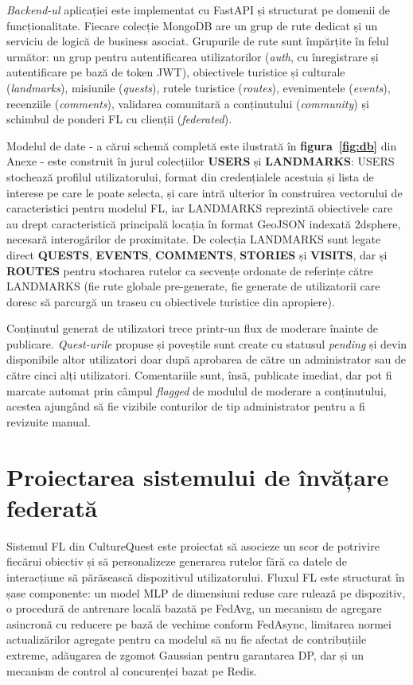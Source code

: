 \documentclass[12pt,a4paper]{report}
\begin{document}
\textit{Backend-ul} aplicației este implementat cu FastAPI și structurat pe domenii de funcționalitate. Fiecare colecție MongoDB are un grup de rute dedicat și un serviciu de logică de business asociat. Grupurile de rute sunt împărțite în felul următor: un grup pentru autentificarea utilizatorilor (\textit{auth}, cu înregistrare și autentificare pe bază de token JWT), obiectivele turistice și culturale (\textit{landmarks}), misiunile (\textit{quests}), rutele turistice (\textit{routes}), evenimentele (\textit{events}), recenziile (\textit{comments}), validarea comunitară a conținutului (\textit{community}) și schimbul de ponderi FL cu clienții (\textit{federated}).

Modelul de date - a cărui schemă completă este ilustrată în \textbf{figura~\ref{fig:db}} din Anexe - este construit în jurul colecțiilor \textbf{USERS} și \textbf{LANDMARKS}: USERS stochează profilul utilizatorului, format din credențialele acestuia și lista de interese pe care le poate selecta, și care intră ulterior în construirea vectorului de caracteristici pentru modelul FL, iar LANDMARKS reprezintă obiectivele care au drept caracteristică principală locația în format GeoJSON indexată 2dsphere, necesară interogărilor de proximitate. De colecția LANDMARKS sunt legate direct \textbf{QUESTS}, \textbf{EVENTS}, \textbf{COMMENTS}, \textbf{STORIES} și \textbf{VISITS}, dar și \textbf{ROUTES} pentru stocharea rutelor ca secvențe ordonate de referințe către LANDMARKS (fie rute globale pre-generate, fie generate de utilizatorii care doresc să parcurgă un traseu cu obiectivele turistice din apropiere).

Conținutul generat de utilizatori trece printr-un flux de moderare înainte de publicare. \textit{Quest-urile} propuse și poveștile sunt create cu statusul \textit{pending} și devin disponibile altor utilizatori doar după aprobarea de către un administrator sau de către cinci alți utilizatori. Comentariile sunt, însă, publicate imediat, dar pot fi marcate automat prin câmpul \textit{flagged} de modulul de moderare a conținutului, acestea ajungând să fie vizibile conturilor de tip administrator pentru a fi revizuite manual.

\section{Proiectarea sistemului de învățare federată}

Sistemul FL din CultureQuest este proiectat să asocieze un scor de potrivire fiecărui obiectiv și să personalizeze generarea rutelor fără ca datele de interacțiune să părăsească dispozitivul utilizatorului. Fluxul FL este structurat în șase componente: un model MLP de dimensiuni reduse care rulează pe dispozitiv, o procedură de antrenare locală bazată pe FedAvg, un mecanism de agregare asincronă cu reducere pe bază de vechime conform FedAsync, limitarea normei actualizărilor agregate pentru ca modelul să nu fie afectat de contribuțiile extreme, adăugarea de zgomot Gaussian pentru garantarea DP, dar și un mecanism de control al concurenței bazat pe Redis.
\end{document}
